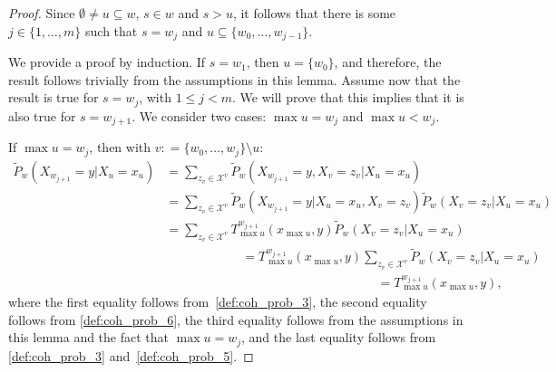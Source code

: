 \documentclass[10pt,a4paper]{paper}
\theoremstyle{definition}
\newcommand{\states}{\mathcal{X}}
\newcommand{\coloneqq}{:\!=}
\begin{document}
\begin{proof}
Since $\emptyset\neq u\subseteq w$, $s\in w$ and $s>u$, it follows that there is some $j\in\{1,\dots,m\}$ such that $s=w_j$ and $u\subseteq\{w_0,\dots,w_{j-1}\}$.

We provide a proof by induction. If $s=w_1$, then $u=\{w_0\}$, and therefore, the result follows trivially from the assumptions in this lemma. Assume now that the result is true for $s=w_j$, with $1\leq j<m$. We will prove that this implies that it is also true for $s=w_{j+1}$. We consider two cases: $\max u=w_j$ and $\max u<w_j$.

If $\max u=w_j$, then with $v\coloneqq\{w_0,\dots,w_j\}\setminus u$:
\begin{align*}
\tilde{P}_w(X_{w_{j+1}}=y\vert X_u=x_u)
&=\sum_{z_{v}\in\states^{v}}\tilde{P}_w(X_{w_{j+1}}=y, X_{v}=z_{v}\vert X_u=x_u)\\
&=\sum_{z_{v}\in\states^{v}}
\tilde{P}_w(X_{w_{j+1}}=y\vert X_u=x_u, X_{v}=z_{v})
\tilde{P}_w(X_{v}=z_{v}\vert X_u=x_u)\\
&=\sum_{z_{v}\in\states^{v}}
T_{\max u}^{w_{j+1}}(x_{\max u},y)
\tilde{P}_w(X_{v}=z_{v}\vert X_u=x_u)\\[-1mm]
&\quad\quad\quad\quad\quad\quad
=T_{\max u}^{w_{j+1}}(x_{\max u},y)
\sum_{z_{v}\in\states^{v}}
\tilde{P}_w(X_{v}=z_{v}\vert X_u=x_u)\\[-1mm]
&\quad\quad\quad\quad\quad\quad\quad\quad\quad\quad\quad\quad\quad\quad\quad\quad~~~
=T_{\max u}^{w_{j+1}}(x_{\max u},y),
\end{align*}
where the first equality follows from~\ref{def:coh_prob_3}, the second equality follows from \ref{def:coh_prob_6}, the third equality follows from the assumptions in this lemma and the fact that $\max u=w_j$, and the last equality follows from \ref{def:coh_prob_3} and~\ref{def:coh_prob_5}.


\end{proof}
\end{document}
